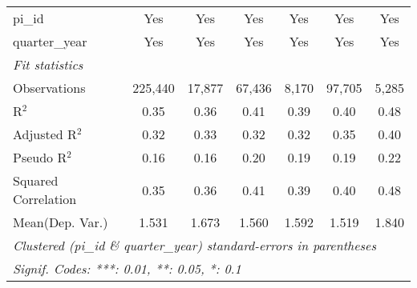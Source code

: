 \begin{tabular}{lcccccc}
   pi\_id                                                     & Yes           & Yes            & Yes           & Yes           & Yes           & Yes\\  
   quarter\_year                                              & Yes           & Yes            & Yes           & Yes           & Yes           & Yes\\  
   \midrule
   \emph{Fit statistics}\\
   Observations                                               & 225,440       & 17,877         & 67,436        & 8,170         & 97,705        & 5,285\\  
   R$^2$                                                      & 0.35          & 0.36           & 0.41          & 0.39          & 0.40          & 0.48\\  
   Adjusted R$^2$                                             & 0.32          & 0.33           & 0.32          & 0.32          & 0.35          & 0.40\\  
   Pseudo R$^2$                                               & 0.16          & 0.16           & 0.20          & 0.19          & 0.19          & 0.22\\  
   Squared Correlation                                        & 0.35          & 0.36           & 0.41          & 0.39          & 0.40          & 0.48\\  
Mean(Dep. Var.) & 1.531 & 1.673 & 1.560 & 1.592 & 1.519 & 1.840 \\
   \midrule \midrule
   \multicolumn{7}{l}{\emph{Clustered (pi\_id \& quarter\_year) standard-errors in parentheses}}\\
   \multicolumn{7}{l}{\emph{Signif. Codes: ***: 0.01, **: 0.05, *: 0.1}}\\
\end{tabular}
\par\endgroup
